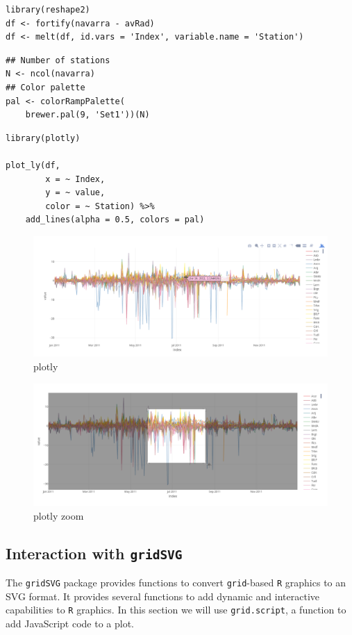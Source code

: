 \documentclass[smallroyalvopaper]{memoir}
\begin{document}
\lstset{language=r,label= ,caption= ,captionpos=b,numbers=none}
\begin{lstlisting}
library(reshape2)
df <- fortify(navarra - avRad)
df <- melt(df, id.vars = 'Index', variable.name = 'Station')
\end{lstlisting}

\lstset{language=r,label= ,caption= ,captionpos=b,numbers=none}
\begin{lstlisting}
## Number of stations
N <- ncol(navarra)
## Color palette
pal <- colorRampPalette(
    brewer.pal(9, 'Set1'))(N)
\end{lstlisting}


\lstset{language=r,label= ,caption= ,captionpos=b,numbers=none}
\begin{lstlisting}
library(plotly)

plot_ly(df,
        x = ~ Index,
        y = ~ value,
        color = ~ Station) %>%
    add_lines(alpha = 0.5, colors = pal)
\end{lstlisting}
\begin{figure}[htbp]
\centering
\includegraphics[width=.9\linewidth]{figs/plotly_navarra.png}
\caption{plotly \label{fig:plotly}}
\end{figure}

\begin{figure}[htbp]
\centering
\includegraphics[width=.9\linewidth]{figs/plotly_navarra_zoom.png}
\caption{plotly zoom \label{fig:plotly_zoom}}
\end{figure}


\subsection{\floweroneleft Interaction with \texttt{gridSVG}}
\label{sec:orgffddf53}
The \texttt{gridSVG} package provides functions to convert \texttt{grid}-based \texttt{R}
graphics to an SVG format. It provides several functions to add
dynamic and interactive capabilities to \texttt{R} graphics. In this section
we will use \texttt{grid.script}, a function to add JavaScript code to a
plot.
\end{document}
